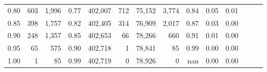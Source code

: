 \begin{tabular}{rrrrrrrrrrrrrr}
0.80 &      603 &  1,996 &  0.77 &  402,007 &      712 &  75,152 &   3,774 &  0.84 &  0.05 &      0.01 \\
0.85 &      398 &  1,757 &  0.82 &  402,405 &      314 &  76,909 &   2,017 &  0.87 &  0.03 &      0.00 \\
0.90 &      248 &  1,357 &  0.85 &  402,653 &       66 &  78,266 &     660 &  0.91 &  0.01 &      0.00 \\
0.95 &       65 &    575 &  0.90 &  402,718 &        1 &  78,841 &      85 &  0.99 &  0.00 &      0.00 \\
1.00 &        1 &     85 &  0.99 &  402,719 &        0 &  78,926 &       0 &   nan &  0.00 &      0.00 \\
\bottomrule
\end{tabular}
